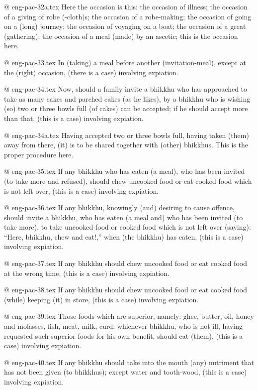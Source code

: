 @ eng-pac-32a.tex
Here the occasion is this: the occasion of illness; the occasion of a giving of robe (-cloth)s; the occasion of a robe-making; the occasion of going on a (long) journey; the occasion of voyaging on a boat; the occasion of a great (gathering); the occasion of a meal (made) by an ascetic; this is the occasion here.

@ eng-pac-33.tex
In (taking) a meal before another (invitation-meal), except at the (right) occasion, (there is a case) involving expiation.

@ eng-pac-34.tex
Now, should a family invite a bhikkhu who has approached to take as many cakes and parched cakes (as he likes), by a bhikkhu who is wishing (so) two or three bowls full (of cakes) can be accepted; if he should accept more than that, (this is a case) involving expiation.

@ eng-pac-34a.tex
Having accepted two or three bowls full, having taken (them) away from there, (it) is to be shared 
together with (other) bhikkhus. This is the proper procedure here.

@ eng-pac-35.tex
If any bhikkhu who has eaten (a meal), who has been invited (to take more and refused), should chew uncooked food or eat cooked food which is not left over, (this is a case) involving expiation.

@ eng-pac-36.tex
If any bhikkhu, knowingly (and) desiring to cause offence, should invite a bhikkhu, who has eaten (a meal and) who has been invited (to take more), to take uncooked food or cooked food which is not left over (saying): “Here, bhikkhu, chew and eat!,” when (the bhikkhu) has eaten, (this is a case) involving expiation.

@ eng-pac-37.tex
If any bhikkhu should chew uncooked food or eat cooked food at the wrong time, (this is a case) involving expiation.

@ eng-pac-38.tex
If any bhikkhu should chew uncooked food or eat cooked food (while) keeping (it) in store, (this is a case) involving expiation.

@ eng-pac-39.tex
Those foods which are superior, namely: ghee, butter, oil, honey and molasses, fish, meat, milk, curd; whichever bhikkhu, who is not ill, having requested such superior foods for his own benefit, should eat (them), (this is a case) involving expiation.

@ eng-pac-40.tex
If any bhikkhu should take into the mouth (any) nutriment that has not been given (to bhikkhus); except water and tooth-wood, (this is a case) involving expiation.

